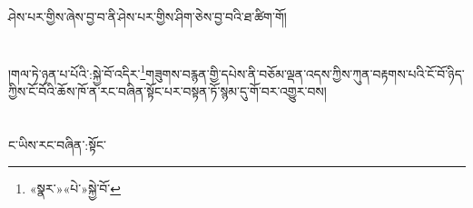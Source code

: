 ཤེས་པར་གྱིས་ཞེས་བྱ་བ་ནི་ཤེས་པར་གྱིས་ཤིག་ཅེས་བྱ་བའི་ཐ་ཚིག་གོ།\chapter{ }།གལ་ཏེ་ཉན་པ་པོའི་:སྐྱེ་བོ་འདིར་\footnote{«སྣར་»«པེ་»སྐྱེ་བོ་}གཟུགས་བརྙན་གྱི་དཔེས་ནི་བཅོམ་ལྡན་འདས་ཀྱིས་ཀུན་བརྟགས་པའི་ངོ་བོ་ཉིད་ཀྱིས་ངོ་བོའི་ཆོས་ཁོ་ན་རང་བཞིན་སྟོང་པར་བསྟན་ཏོ་སྙམ་དུ་གོ་བར་འགྱུར་བས།\chapter{ }ང་ཡིས་རང་བཞིན་:སྟོང་